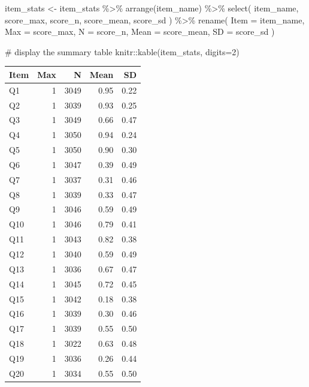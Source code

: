 \documentclass[
  letterpaper,
  DIV=11,
  numbers=noendperiod]{scrreprt}
\newenvironment{Shaded}{\begin{snugshade}}{\end{snugshade}}
\newcommand{\AttributeTok}[1]{\textcolor[rgb]{0.40,0.45,0.13}{#1}}
\newcommand{\CommentTok}[1]{\textcolor[rgb]{0.37,0.37,0.37}{#1}}
\newcommand{\DecValTok}[1]{\textcolor[rgb]{0.68,0.00,0.00}{#1}}
\newcommand{\FunctionTok}[1]{\textcolor[rgb]{0.28,0.35,0.67}{#1}}
\newcommand{\NormalTok}[1]{\textcolor[rgb]{0.00,0.23,0.31}{#1}}
\newcommand{\OtherTok}[1]{\textcolor[rgb]{0.00,0.23,0.31}{#1}}
\newcommand{\SpecialCharTok}[1]{\textcolor[rgb]{0.37,0.37,0.37}{#1}}
\begin{document}
\begin{Shaded}
\begin{Highlighting}[]
\NormalTok{item\_stats }\OtherTok{\textless{}{-}}\NormalTok{ item\_stats }\SpecialCharTok{\%\textgreater{}\%} \FunctionTok{arrange}\NormalTok{(item\_name) }\SpecialCharTok{\%\textgreater{}\%}
    \FunctionTok{select}\NormalTok{(}
\NormalTok{        item\_name,}
\NormalTok{        score\_max,}
\NormalTok{        score\_n,}
\NormalTok{        score\_mean,}
\NormalTok{        score\_sd}
\NormalTok{    ) }\SpecialCharTok{\%\textgreater{}\%} \FunctionTok{rename}\NormalTok{(}
        \AttributeTok{Item =}\NormalTok{ item\_name,}
        \AttributeTok{Max =}\NormalTok{ score\_max,}
        \AttributeTok{N =}\NormalTok{ score\_n,}
        \AttributeTok{Mean =}\NormalTok{ score\_mean,}
        \AttributeTok{SD =}\NormalTok{ score\_sd}
\NormalTok{    )}

\CommentTok{\# display the summary table}
\NormalTok{knitr}\SpecialCharTok{::}\FunctionTok{kable}\NormalTok{(item\_stats, }\AttributeTok{digits=}\DecValTok{2}\NormalTok{)}
\end{Highlighting}
\end{Shaded}

\begin{longtable}[]{@{}lrrrr@{}}
\toprule\noalign{}
Item & Max & N & Mean & SD \\
\midrule\noalign{}
\endhead
\bottomrule\noalign{}
\endlastfoot
Q1 & 1 & 3049 & 0.95 & 0.22 \\
Q2 & 1 & 3039 & 0.93 & 0.25 \\
Q3 & 1 & 3049 & 0.66 & 0.47 \\
Q4 & 1 & 3050 & 0.94 & 0.24 \\
Q5 & 1 & 3050 & 0.90 & 0.30 \\
Q6 & 1 & 3047 & 0.39 & 0.49 \\
Q7 & 1 & 3037 & 0.31 & 0.46 \\
Q8 & 1 & 3039 & 0.33 & 0.47 \\
Q9 & 1 & 3046 & 0.59 & 0.49 \\
Q10 & 1 & 3046 & 0.79 & 0.41 \\
Q11 & 1 & 3043 & 0.82 & 0.38 \\
Q12 & 1 & 3040 & 0.59 & 0.49 \\
Q13 & 1 & 3036 & 0.67 & 0.47 \\
Q14 & 1 & 3045 & 0.72 & 0.45 \\
Q15 & 1 & 3042 & 0.18 & 0.38 \\
Q16 & 1 & 3039 & 0.30 & 0.46 \\
Q17 & 1 & 3039 & 0.55 & 0.50 \\
Q18 & 1 & 3022 & 0.63 & 0.48 \\
Q19 & 1 & 3036 & 0.26 & 0.44 \\
Q20 & 1 & 3034 & 0.55 & 0.50 \\
\end{longtable}
\end{document}

